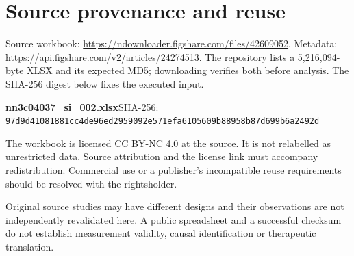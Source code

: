 \documentclass[11pt]{article}
\begin{document}
\label{main-text-end}
\clearpage
\nocite{ref32ce5d18e6e9,ref78be280f5a7c,ref15e4cde02490,ref0599982c3182,refbeea5aa0e77d,refe80b2aa9bb29,ref9a5ad3c915c4,ref24d3108d355f,ref8dd715dd984f,ref8ac43feb0ac0,ref5c51e052743a}

\clearpage
\appendix
\setcounter{table}{0}
\renewcommand{\thetable}{S\arabic{table}}
\section{Source provenance and reuse}
Source workbook: \url{https://ndownloader.figshare.com/files/42609052}. Metadata: \url{https://api.figshare.com/v2/articles/24274513}. The repository lists a 5,216,094-byte XLSX and its expected MD5; downloading verifies both before analysis. The SHA-256 digest below fixes the executed input.

\textbf{nn3c04037\_si\_002.xlsx}\newline{}SHA-256: \texttt{97d9d410\allowbreak{}81881cc4\allowbreak{}de96ed29\allowbreak{}59092e57\allowbreak{}1efa6105\allowbreak{}609b8895\allowbreak{}8b87d699\allowbreak{}b6a2492d}

The workbook is licensed CC BY-NC 4.0 at the source. It is not relabelled as unrestricted data. Source attribution and the license link must accompany redistribution. Commercial use or a publisher's incompatible reuse requirements should be resolved with the rightsholder.

Original source studies may have different designs and their observations are not independently revalidated here. A public spreadsheet and a successful checksum do not establish measurement validity, causal identification or therapeutic translation.
\end{document}
